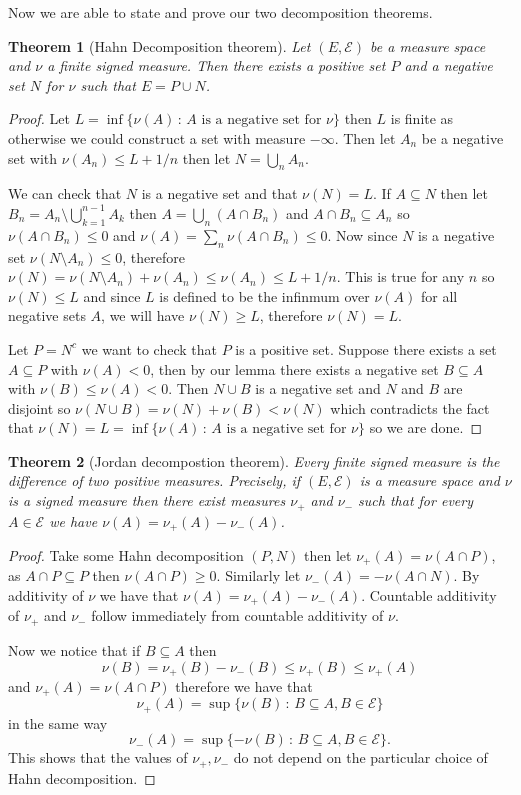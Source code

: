 \documentclass[11pt]{article}
\newtheorem{thm}{Theorem}[section]
\theoremstyle{definition}
\theoremstyle{remark}
\begin{document}
Now we are able to state and prove our two decomposition theorems.
\begin{thm}[Hahn Decomposition theorem]
Let $(E, \mathcal{E})$ be a measure space and $\nu$ a finite signed measure. Then there exists a positive set $P$ and a negative set $N$ for $\nu$ such that $E = P \cup N$.
\end{thm}
\begin{proof}
Let $L = \inf\{ \nu(A)\,:\, \mbox{$A$ is a negative set for $\nu$}\}$ then $L$ is finite as otherwise we could construct a set with measure $-\infty$. Then let $A_n$ be a negative set with $\nu(A_n) \leq L+1/n$ then let $N = \bigcup_n A_n$.

 We can check that $N$ is a negative set and that $\nu(N) = L$. If $A \subseteq N$ then let $B_n = A_n \setminus \bigcup_{k=1}^{n-1}A_k$ then  $A = \bigcup_n (A \cap B_n)$ and $A \cap B_n \subseteq A_n$ so $\nu(A \cap B_n) \leq 0$ and $\nu(A) = \sum_n \nu(A \cap B_n) \leq 0$.  Now since $N$ is a negative set $\nu(N \setminus A_n) \leq 0$, therefore $\nu(N) = \nu(N \setminus A_n) + \nu(A_n) \leq \nu(A_n) \leq L +1/n$. This is true for any $n$ so $\nu(N) \leq L$ and since $L$ is defined to be the infinmum over $\nu(A)$ for all negative sets $A$, we will have $\nu(N) \geq L$, therefore $\nu(N) = L$.

Let $P = N^c$ we want to check that $P$ is a positive set. Suppose there exists a set $A \subseteq P$ with $\nu(A) < 0$, then by our lemma there exists a negative set $B \subseteq A$ with $\nu(B) \leq \nu(A)<0$. Then $N \cup B$ is a negative set and $N$ and $B$ are disjoint so $\nu(N \cup B) = \nu(N) + \nu(B) < \nu(N)$ which contradicts the fact that $\nu(N) = L = \inf\{ \nu(A)\,:\, \mbox{$A$ is a negative set for $\nu$}\}$ so we are done.
\end{proof}

\begin{thm}[Jordan decompostion theorem]
Every finite signed measure is the difference of two positive measures. Precisely, if $(E, \mathcal{E})$ is a measure space and $\nu$ is a signed measure then there exist measures $\nu_+$ and $\nu_-$ such that for every $A \in \mathcal{E}$ we have $\nu(A) = \nu_+(A)- \nu_-(A)$.
\end{thm}
\begin{proof}
Take some Hahn decomposition $(P, N)$ then let $\nu_+(A) = \nu(A \cap P)$, as $A \cap P \subseteq P$ then $\nu(A \cap P) \geq 0$. Similarly let $\nu_-(A) = -\nu(A \cap N)$. By additivity of $\nu$ we have that $\nu(A) = \nu_+(A) - \nu_-(A)$. Countable additivity of $\nu_+$ and $\nu_-$ follow immediately from countable additivity of $\nu$.

Now we notice that if $B \subseteq A$ then
\[ \nu(B) = \nu_+(B) - \nu_-(B) \leq \nu_+(B) \leq \nu_+(A) \] and $\nu_+(A) = \nu(A \cap P)$ therefore we have that
\[ \nu_+(A)  = \sup\{\nu(B) \,:\, B \subseteq A, B \in \mathcal{E}\} \] in the same way
\[ \nu_-(A) = \sup\{ - \nu(B) \,:\, B \subseteq A, B \in \mathcal{E}\}. \] This shows that the values of $\nu_+, \nu_-$ do not depend on the particular choice of Hahn decomposition.
\end{proof}
\end{document}
